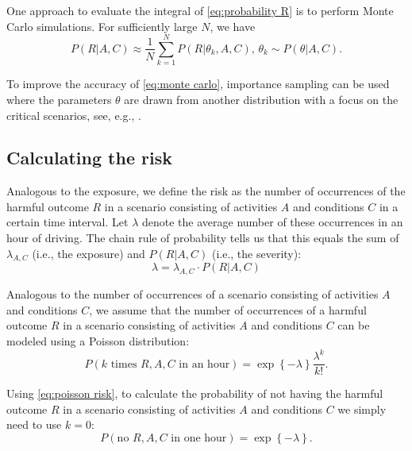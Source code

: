 One approach to evaluate the integral of \cref{eq:probability R} is to perform Monte Carlo simulations. For sufficiently large $N$, we have
\begin{equation} \label{eq:monte carlo}
	P(R|A,C) \approx \frac{1}{N} \sum_{k=1}^N P(R|\theta_k,A,C), \, \theta_k \sim P(\theta|A,C).
\end{equation}

To improve the accuracy of \cref{eq:monte carlo}, importance sampling can be used where the parameters $\theta$ are drawn from another distribution with a focus on the critical scenarios, see, e.g., \cite{deGelder2017assessment}.



\subsection{Calculating the risk}
\label{sec:risk}

Analogous to the exposure, we define the risk as the number of occurrences of the harmful outcome $R$ in a scenario consisting of activities $A$ and conditions $C$ in a certain time interval. Let $\lambda$ denote the average number of these occurrences in an hour of driving. The chain rule of probability tells us that this equals the sum of $\lambda_{A,C}$ (i.e., the exposure) and $P(R|A,C)$ (i.e., the severity):
\begin{equation} \label{eq:risk}
	\lambda = \lambda_{A,C} \cdot P(R|A,C)
\end{equation}

Analogous to the number of occurrences of a scenario consisting of activities $A$ and conditions $C$, we assume that the number of occurrences of a harmful outcome $R$ in a scenario consisting of activities $A$ and conditions $C$ can be modeled using a Poisson distribution:
\begin{equation} \label{eq:poisson risk}
	P(k\text{ times }R,A,C\text{ in an hour}) = \exp \left\{ -\lambda \right\} \frac{\lambda^k}{k!}.
\end{equation}

Using \cref{eq:poisson risk}, to calculate the probability of not having the harmful outcome $R$ in a scenario consisting of activities $A$ and conditions $C$ we simply need to use $k=0$:
\begin{equation} \label{eq:no harm}
	P(\text{no }R,A,C\text{ in one hour}) = \exp \left\{ -\lambda \right\}.
\end{equation}


